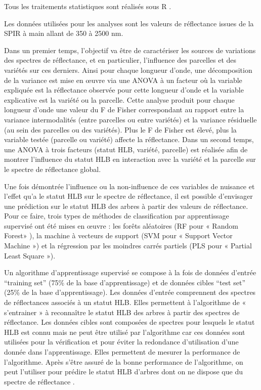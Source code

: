 \documentclass[
  11pt,
  french,
  a4paper,
  extrafontsizes,onecolumn,openright
  ]{memoir}
\begin{document}
Tous les traitements statistiques sont réalisés sous R \autocite{R}.

Les données utilisées pour les analyses sont les valeurs de réflectance issues de la SPIR à main allant de 350 à 2500 nm.

Dans un premier temps, l'objectif va être de caractériser les sources de variations des spectres de réflectance, et en particulier, l'influence des parcelles et des variétés sur ces derniers. Ainsi pour chaque longueur d'onde, une décomposition de la variance est mise en œuvre via une ANOVA à un facteur où la variable expliquée est la réflectance observée pour cette longueur d'onde et la variable explicative est la variété ou la parcelle. Cette analyse produit pour chaque longueur d'onde une valeur du F de Fisher correspondant au rapport entre la variance intermodalités (entre parcelles ou entre variétés) et la variance résiduelle (au sein des parcelles ou des variétés). Plus le F de Fisher est élevé, plus la variable testée (parcelle ou variété) affecte la réflectance.
Dans un second temps, une ANOVA à trois facteurs (statut HLB, variété, parcelle) est réalisée afin de montrer l'influence du statut HLB en interaction avec la variété et la parcelle sur le spectre de réflectance global.

Une fois démontrée l'influence ou la non-influence de ces variables de nuisance et l'effet qu'a le statut HLB sur le spectre de réflectance, il est possible d'envisager une prédiction sur le statut HLB des arbres à partir des valeurs de réflectance. Pour ce faire, trois types de méthodes de classification par apprentissage supervisé ont été mises en œuvre : les forêts aléatoires (RF pour « Random Forest» ), la machine à vecteurs de support (SVM pour « Support Vector Machine ») et la régression par les moindres carrés partiels (PLS pour « Partial Least Square »).

Un algorithme d'apprentissage supervisé se compose à la fois de données d'entrée ``training set'' (75\% de la base d'apprentissage) et de données cibles ``test set'' (25\% de la base d'apprentissage)\autocite{caTools}. Les données d'entrée comprennent des spectres de réflectances associés à un statut HLB. Elles permettent à l'algorithme de « s'entrainer » à reconnaître le statut HLB des arbres à partir des spectres de réflectance. Les données cibles sont composées de spectres pour lesquels le statut HLB est connu mais ne peut être utilisé par l'algorithme car ces données sont utilisées pour la vérification et pour éviter la redondance d'utilisation d'une donnée dans l'apprentissage. Elles permettent de mesurer la performance de l'algorithme. Après s'être assuré de la bonne performance de l'algorithme, on peut l'utiliser pour prédire le statut HLB d'arbres dont on ne dispose que du spectre de réflectance \autocite{snowfall}.
\end{document}

